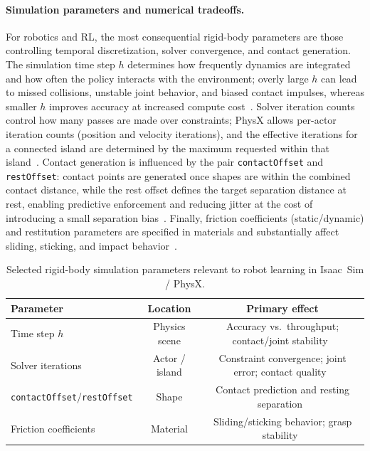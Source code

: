 \paragraph{Simulation parameters and numerical tradeoffs.}
For robotics and \ac{RL}, the most consequential rigid-body parameters are those controlling
temporal discretization, solver convergence, and contact generation.
The simulation time step $h$ determines how frequently dynamics are integrated and how
often the policy interacts with the environment; overly large $h$ can lead to missed
collisions, unstable joint behavior, and biased contact impulses, whereas smaller $h$
improves accuracy at increased compute cost~\cite{physx_simulation_541,physx_best_practices_541}.
Solver iteration counts control how many passes are made over constraints; PhysX allows
per-actor iteration counts (position and velocity iterations), and the effective iterations for a
connected island are determined by the maximum requested within that island~\cite{physx_simulation_541,physx_rigid_body_dynamics_511}.
Contact generation is influenced by the pair \texttt{contactOffset} and \texttt{restOffset}: contact
points are generated once shapes are within the combined contact distance, while the rest
offset defines the target separation distance at rest, enabling predictive enforcement and
reducing jitter at the cost of introducing a small separation bias~\cite{physx_advanced_collision_detection_512}.
Finally, friction coefficients (static/dynamic) and restitution parameters are specified in
materials and substantially affect sliding, sticking, and impact behavior~\cite{physx_material_api_510,physx_rigid_body_dynamics_511}.

\begin{table}[htb]
    \centering
    \caption{Selected rigid-body simulation parameters relevant to robot learning in Isaac~Sim / PhysX.}\label{tab:physx_rigid_body_parameters}
    \begin{tabular}{l c c}
    \hline
    \textbf{Parameter} & \textbf{Location} & \textbf{Primary effect} \\
    \hline
    Time step $h$ & Physics scene & Accuracy vs.\ throughput; contact/joint stability~\cite{physx_simulation_541} \\
    Solver iterations & Actor / island & Constraint convergence; joint error; contact quality~\cite{physx_rigid_body_dynamics_511} \\
    \texttt{contactOffset}/\texttt{restOffset} & Shape & Contact prediction and resting separation~\cite{physx_advanced_collision_detection_512} \\
    Friction coefficients & Material & Sliding/sticking behavior; grasp stability~\cite{physx_material_api_510} \\
    \hline
    \end{tabular}
\end{table}

